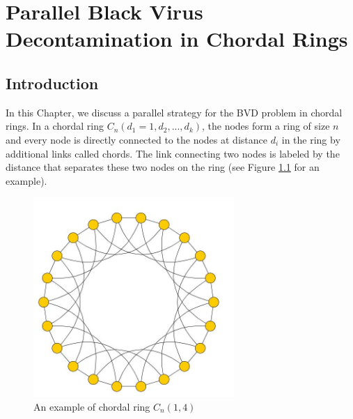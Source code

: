 


\chapter {Parallel Black Virus Decontamination in Chordal Rings}
\label{TL}
 

\section{Introduction}
In this Chapter, we discuss a parallel strategy for  the BVD problem in chordal rings. In a  chordal ring $C_n(d_1=1, d_2, ..., d_k)$, the nodes form a ring of size $n$ and every node is directly connected to the nodes at distance $d_i$ in the ring by additional links called chords. The link connecting two nodes is labeled by the distance that separates these two nodes on the ring (see Figure \ref{fig:chordalring} for an example).
 
\begin{figure}[H]
  \centering  
  \includegraphics[width=3in]{figures/chordalring.png}
  \caption{An example of chordal ring $C_n(1,4)$}\label{fig:chordalring}
\end{figure}

